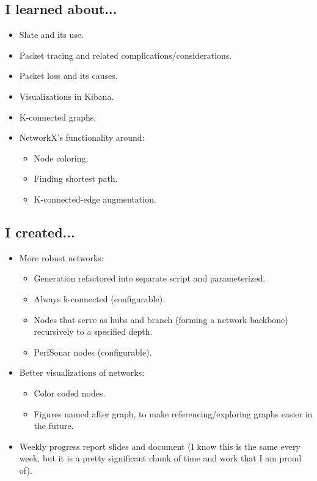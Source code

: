 \documentclass{weeklyreport}
\begin{document}
\subsection*{I learned about...}
\begin{itemize}
	\item Slate and its use.
	\item Packet tracing and related complications/considerations.
	\item Packet loss and its causes.
	\item Visualizations in Kibana.
	\item K-connected graphs.
	\item NetworkX's functionality around:
	\begin{itemize}
		\item Node coloring.
		\item Finding shortest path.
		\item K-connected-edge augmentation.
	\end{itemize}
\end{itemize}

\subsection*{I created...}
\begin{itemize}
	\item More robust networks:
	\begin{itemize}
		\item Generation refactored into separate script and parameterized.
		\item Always k-connected (configurable).
		\item Nodes that serve as hubs and branch (forming a network backbone) recursively to a specified depth.
		\item PerfSonar nodes (configurable).
	\end{itemize}
	\item Better visualizations of networks:
	\begin{itemize}
		\item Color coded nodes.
		\item Figures named after graph, to make referencing/exploring graphs easier in the future.
	\end{itemize}
	\item Weekly progress report slides and document (I know this is the same every week, but it is a pretty significant chunk of time and work that I am proud of).
\end{itemize}
\end{document}
